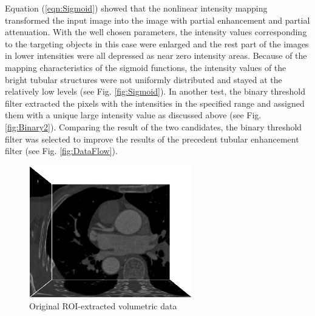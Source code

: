 Equation (\ref{eqn:Sigmoid}) showed that the nonlinear intensity mapping transformed the input image into the image with partial enhancement and partial attenuation.
With the well chosen parameters, the intensity values corresponding to the targeting objects in this case were enlarged and the rest part of the images in lower intensities were all depressed as near zero intensity areas. %
Because of the mapping characteristics of the sigmoid functions, the intensity values of the bright tubular structures were not uniformly distributed and stayed at the relatively low levels (see Fig. \ref{fig:Sigmoid}). %
In another test, the binary threshold filter extracted the pixels with the intensities in the specified range and assigned them with a unique large intensity value as discussed above (see Fig. \ref{fig:Binary2}). %
Comparing the result of the two candidates, the binary threshold filter was selected to improve the results of the precedent tubular enhancement filter (see Fig. \ref{fig:DataFlow}). %
\begin{figure}[t]
\centering
\includegraphics[width=2.8in]{Figures/chap04/original.png}
\caption{Original ROI-extracted volumetric data}
\label{fig:Original}
\end{figure}
